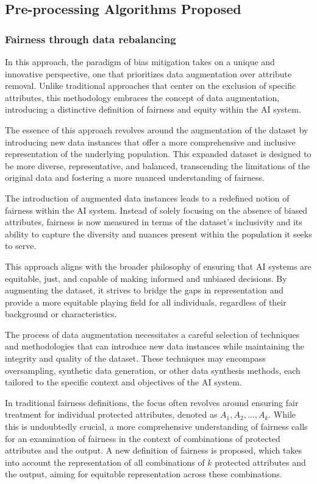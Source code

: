 \subsection{Pre-processing Algorithms Proposed}

\subsubsection{Fairness through data rebalancing}
\label{subsec:ftdr}

In this approach, the paradigm of bias mitigation takes on a unique and innovative perspective, one that prioritizes data augmentation over attribute removal. Unlike traditional approaches that center on the exclusion of specific attributes, this methodology embraces the concept of data augmentation, introducing a distinctive definition of fairness and equity within the AI system.

The essence of this approach revolves around the augmentation of the dataset by introducing new data instances that offer a more comprehensive and inclusive representation of the underlying population. This expanded dataset is designed to be more diverse, representative, and balanced, transcending the limitations of the original data and fostering a more nuanced understanding of fairness. 

The introduction of augmented data instances leads to a redefined notion of fairness within the AI system. Instead of solely focusing on the absence of biased attributes, fairness is now measured in terms of the dataset's inclusivity and its ability to capture the diversity and nuances present within the population it seeks to serve. 

This approach aligns with the broader philosophy of ensuring that AI systems are equitable, just, and capable of making informed and unbiased decisions. By augmenting the dataset, it strives to bridge the gaps in representation and provide a more equitable playing field for all individuals, regardless of their background or characteristics. 

The process of data augmentation necessitates a careful selection of techniques and methodologies that can introduce new data instances while maintaining the integrity and quality of the dataset. These techniques may encompass oversampling, synthetic data generation, or other data synthesis methods, each tailored to the specific context and objectives of the AI system.

In traditional fairness definitions, the focus often revolves around ensuring fair treatment for individual protected attributes, denoted as $A_1, A_2, \ldots, A_k$. While this is undoubtedly crucial, a more comprehensive understanding of fairness calls for an examination of fairness in the context of combinations of protected attributes and the output. A new definition of fairness is proposed, which takes into account the representation of all combinations of $k$ protected attributes and the output, aiming for equitable representation across these combinations.

